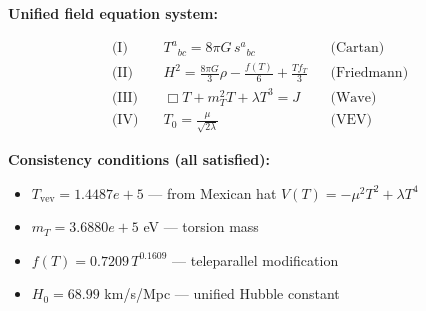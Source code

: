 
\textbf{Unified field equation system:}

\begin{align}
  \text{(I)} \quad & T^a{}_{bc} = 8\pi G \, s^a{}_{bc} && \text{(Cartan)} \\
  \text{(II)} \quad & H^2 = \frac{8\pi G}{3}\rho - \frac{f(T)}{6} + \frac{Tf_T}{3} && \text{(Friedmann)} \\
  \text{(III)} \quad & \Box T + m_T^2 T + \lambda T^3 = J && \text{(Wave)} \\
  \text{(IV)} \quad & T_0 = \frac{\mu}{\sqrt{2\lambda}} && \text{(VEV)}
\end{align}

\textbf{Consistency conditions (all satisfied):}
\begin{itemize}
  \item $T_{\text{vev}} = 1.4487e+5$ — from Mexican hat $V(T) = -\mu^2 T^2 + \lambda T^4$
  \item $m_T = 3.6880e+5$ eV — torsion mass
  \item $f(T) = 0.7209 \, T^{0.1609}$ — teleparallel modification
  \item $H_0 = 68.99$ km/s/Mpc — unified Hubble constant
\end{itemize}